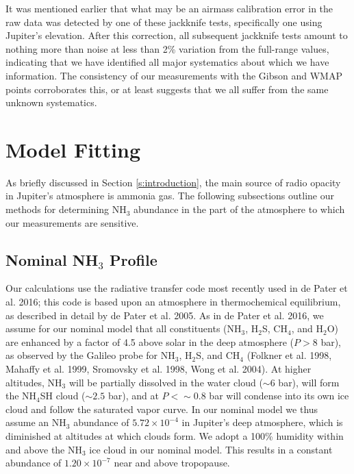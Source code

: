 \documentclass{article}
\newcommand{\e}[1]{\times 10^{#1}}
\begin{document}
	It was mentioned earlier that what may be an airmass calibration error in the raw data was detected by one of these jackknife tests, specifically one using Jupiter's elevation.
	After this correction, all subsequent jackknife tests amount to nothing more than noise at less than 2\% variation from the full-range values, indicating that we have identified all major systematics about which we have information.
	The consistency of our measurements with the Gibson and WMAP points corroborates this, or at least suggests that we all suffer from the same unknown systematics.


\section{Model Fitting} \label{s:model}

	As briefly discussed in Section \ref{s:introduction}, the main source of radio opacity in Jupiter's atmosphere is ammonia gas.
	The following subsections outline our methods for determining NH$_{3}$ abundance in the part of the atmosphere to which our measurements are sensitive.

\subsection{Nominal NH$_{3}$ Profile}

	Our calculations use the radiative transfer code most recently used in de Pater et al. 2016; this code is based upon an atmosphere in thermochemical equilibrium, as described in detail by de Pater et al. 2005.
	As in de Pater et al. 2016, we assume for our nominal model that all constituents (NH$_{3}$, H$_{2}$S, CH$_{4}$, and H$_{2}$O) are enhanced by a factor of 4.5 above solar in the deep atmosphere ($P > 8$ bar), as observed by the Galileo probe for NH$_{3}$, H$_{2}$S, and CH$_{4}$ (Folkner et al. 1998, Mahaffy et al. 1999, Sromovsky et al. 1998, Wong et al. 2004).
	At higher altitudes, NH$_{3}$ will be partially dissolved in the water cloud ($\sim 6$ bar), will form the NH$_{4}$SH cloud ($\sim 2.5$ bar), and at $P < \sim 0.8$ bar will condense into its own ice cloud and follow the saturated vapor curve.
	In our nominal model we thus assume an NH$_{3}$ abundance of $5.72 \e{-4}$ in Jupiter's deep atmosphere, which is diminished at altitudes at which clouds form.
	We adopt a 100\% humidity within and above the NH$_{3}$ ice cloud in our nominal model.
	This results in a constant abundance of $1.20\e{-7}$ near and above tropopause.
\end{document}
